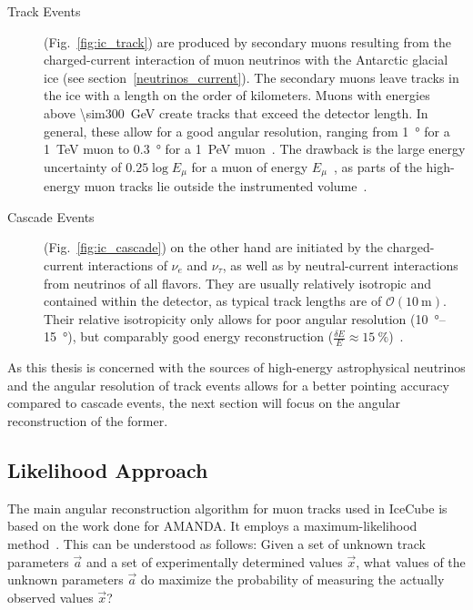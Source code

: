 \begin{description}
    \item[Track Events] (Fig.~\ref{fig:ic_track}) are produced by secondary muons resulting from the charged-current interaction of muon neutrinos with the Antarctic glacial ice (see section~\ref{neutrinos_current}). The secondary muons leave tracks in the ice with a length on the order of kilometers. Muons with energies above \SI{\sim300}{\giga\eV} create tracks that exceed the detector length. In general, these allow for a good angular resolution, ranging from \SI{1}{\degree} for a \SI{1}{\TeV} muon to \SI{0.3}{\degree} for a \SI{1}{\peta\eV} muon~. The drawback is the large energy uncertainty of $0.25 \log{E_\mu}$ for a muon of energy $E_\mu$~, as parts of the high-energy muon tracks lie outside the instrumented volume~.

    \item[Cascade Events] (Fig.~\ref{fig:ic_cascade}) on the other hand are initiated by the charged-current interactions of $\nu_e$ and $\nu_\tau$, as well as by neutral-current interactions from neutrinos of all flavors. They are usually relatively isotropic and contained within the detector, as typical track lengths are of $\mathcal{O}(\SI{10}{\meter})$. Their relative isotropicity only allows for poor angular resolution (\SIrange{10}{15}{\degree}), but comparably good energy reconstruction ($\frac{\delta E}{E} \approx \SI{15}{\percent}$)~\cite{Aartsen2017a}.
\end{description}

As this thesis is concerned with the sources of high-energy astrophysical neutrinos and the angular resolution of track events allows for a better pointing accuracy compared to cascade events, the next section will focus on the angular reconstruction of the former.

\subsection{Likelihood Approach}
The main angular reconstruction algorithm for muon tracks used in IceCube is based on the work done for AMANDA. It employs a maximum-likelihood method~. This can be understood as follows: Given a set of unknown track parameters $\vec{a}$ and a set of experimentally determined values $\vec{x}$, what values of the unknown parameters $\vec{a}$ do maximize the probability of measuring the actually observed values $\vec{x}$?

